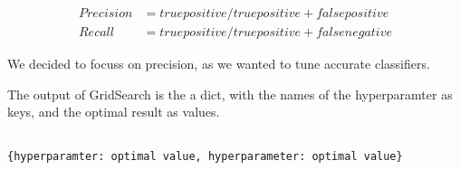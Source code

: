 \documentclass{article}
\begin{document}
\begin{align*}
Precision &= true positive / true positive + false positive\\
Recall &= true positive / true positive + false negative 
\end{align*}

We decided to focuss on precision, as we wanted to tune accurate classifiers. 

The output of GridSearch is the a dict, with the names of the hyperparamter as keys, and the optimal result as values. 

\begin{lstlisting}

{hyperparamter: optimal value, hyperparameter: optimal value}
\end{lstlisting}



\end{document}

